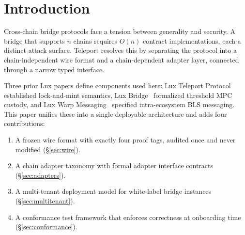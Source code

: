 \section{Introduction}

\label{sec:intro}

Cross-chain bridge protocols face a tension between generality and security. A bridge that supports $n$ chains requires $O(n)$ contract implementations, each a distinct attack surface. Teleport resolves this by separating the protocol into a chain-independent wire format and a chain-dependent adapter layer, connected through a narrow typed interface.

Three prior Lux papers define components used here: Lux Teleport Protocol~\cite{luxtp2022} established lock-and-mint semantics, Lux Bridge~\cite{luxbridge2023} formalized threshold MPC custody, and Lux Warp Messaging~\cite{luxwarp2023} specified intra-ecosystem BLS messaging. This paper unifies these into a single deployable architecture and adds four contributions:

\begin{enumerate}[nosep]
  \item A frozen wire format with exactly four proof tags, audited once and never modified (\S\ref{sec:wire}).
  \item A chain adapter taxonomy with formal adapter interface contracts (\S\ref{sec:adapters}).
  \item A multi-tenant deployment model for white-label bridge instances (\S\ref{sec:multitenant}).
  \item A conformance test framework that enforces correctness at onboarding time (\S\ref{sec:conformance}).
\end{enumerate}


